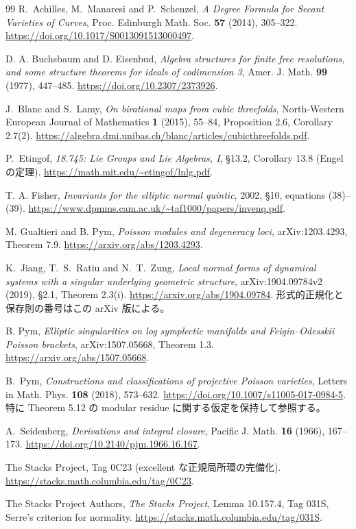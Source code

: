 \documentclass[11pt,a4paper]{ltjsarticle}
\theoremstyle{remark}\newtheorem{remark}[theorem]{注意}
\begin{document}
\begin{thebibliography}{99}
\small
{}
R.~Achilles, M.~Manaresi and P.~Schenzel,
\emph{A Degree Formula for Secant Varieties of Curves},
Proc. Edinburgh Math. Soc. \textbf{57} (2014), 305--322.
\url{https://doi.org/10.1017/S0013091513000497}.

D. A. Buchsbaum and D. Eisenbud,
\emph{Algebra structures for finite free resolutions, and some structure theorems for ideals of codimension 3},
Amer. J. Math. \textbf{99} (1977), 447--485.
\url{https://doi.org/10.2307/2373926}.

J.~Blanc and S.~Lamy, \emph{On birational maps from cubic threefolds},
North-Western European Journal of Mathematics \textbf{1} (2015), 55--84,
Proposition 2.6, Corollary 2.7(2).
\url{https://algebra.dmi.unibas.ch/blanc/articles/cubicthreefolds.pdf}.

P.~Etingof, \emph{18.745: Lie Groups and Lie Algebras, I},
\S13.2, Corollary 13.8 (Engel の定理).
\url{https://math.mit.edu/~etingof/lnlg.pdf}.

T. A. Fisher,
\emph{Invariants for the elliptic normal quintic},
2002, \S10, equations (38)--(39).
\url{https://www.dpmms.cam.ac.uk/~taf1000/papers/invenq.pdf}.

M. Gualtieri and B. Pym,
\emph{Poisson modules and degeneracy loci},
arXiv:1203.4293, Theorem 7.9.
\url{https://arxiv.org/abs/1203.4293}.

K.~Jiang, T.~S.~Ratiu and N.~T.~Zung,
\emph{Local normal forms of dynamical systems with a singular underlying geometric structure},
arXiv:1904.09784v2 (2019), \S2.1, Theorem 2.3(i).
\url{https://arxiv.org/abs/1904.09784}.
形式的正規化と保存則の番号はこの arXiv 版による。

B. Pym,
\emph{Elliptic singularities on log symplectic manifolds and Feigin--Odesskii Poisson brackets},
arXiv:1507.05668, Theorem 1.3.
\url{https://arxiv.org/abs/1507.05668}.

B.~Pym, \emph{Constructions and classifications of projective Poisson varieties},
Letters in Math. Phys. \textbf{108} (2018), 573--632.
\url{https://doi.org/10.1007/s11005-017-0984-5}.
特に Theorem 5.12 の modular residue に関する仮定を保持して参照する。

A.~Seidenberg, \emph{Derivations and integral closure},
Pacific J. Math. \textbf{16} (1966), 167--173.
\url{https://doi.org/10.2140/pjm.1966.16.167}.

The Stacks Project, Tag 0C23 (excellent な正規局所環の完備化).
\url{https://stacks.math.columbia.edu/tag/0C23}.

The Stacks Project Authors, \emph{The Stacks Project},
Lemma 10.157.4, Tag 031S, Serre's criterion for normality.
\url{https://stacks.math.columbia.edu/tag/031S}.
\end{thebibliography}
\end{document}
